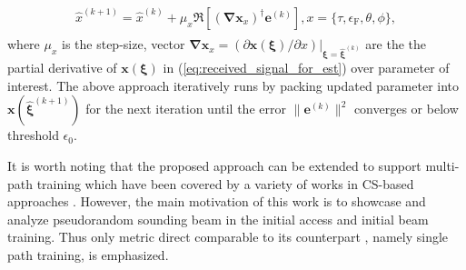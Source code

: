 \documentclass[journal]{IEEEtran}
\newcommand{\CFO}[0]{\epsilon_{\text{F}}}
\begin{document}
\begin{align}
\begin{split}
\hat{x}^{(k+1)} = \hat{x}^{(k)}+ \mu_{x}\Re\left[(\boldsymbol{\nabla}\mathbf{x}_{x})^{\dagger}\mathbf{e}^{(k)}\right], x=\{\tau, \CFO,\theta,\phi\},
\end{split}
\label{eq:refinement}
\end{align}
where $\mu_{x}$ is the step-size, vector $\boldsymbol{\nabla}\mathbf{x}_{x} = (\partial \mathbf{x}(\boldsymbol{\xi})/\partial x)|_{\boldsymbol{\xi} = \hat{\boldsymbol{\xi}}^{(k)}}$ are the the partial derivative of $\mathbf{x}(\boldsymbol{\xi})$ in (\ref{eq:received_signal_for_est}) over parameter of interest. The above approach iteratively runs by packing updated parameter into $\mathbf{x}(\hat{\boldsymbol{\xi}}^{(k+1)})$ for the next iteration until the error $\|\mathbf{e}^{(k)}\|^2$
converges or below threshold $\epsilon_0$.

It is worth noting that the proposed approach can be extended to support multi-path training which have been covered by a variety of works in CS-based approaches \cite{7390019,8306126,8356247,8488662,8323164,Myers_CFO_SPAWC_1707,8309152,Myers_CFO_arxiv_1803}. However, the main motivation of this work is to showcase and analyze pseudorandom sounding beam in the initial access and initial beam training. Thus only metric direct comparable to its counterpart \cite{7161389,Caire_DIA_arxiv_1709,UTA_stocha_geo_IA_TCOM_18,KTH_stoch_geo_IA_arxiv_1802,Meng_OIA_TCOM_1803,Zorzi_IA_MCOM_1611,UTA_IA_TWC_1705,Giordani_beam_turotial_arxiv_1804}, namely single path training, is emphasized. 
\end{document}
